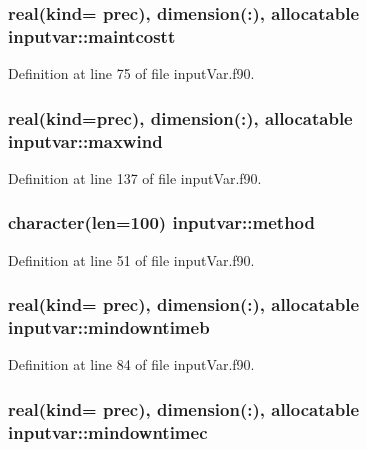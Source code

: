\hypertarget{classinputvar_abeac95d7e558ca06d4456187b380fdbc}{
\subsubsection[{maintcostt}]{\setlength{\rightskip}{0pt plus 5cm}real(kind= prec), dimension(\-:), allocatable inputvar\-::maintcostt}}\label{classinputvar_abeac95d7e558ca06d4456187b380fdbc}


Definition at line 75 of file input\-Var.\-f90.

\hypertarget{classinputvar_a42a243861fa635356cdd79a587633909}{
\subsubsection[{maxwind}]{\setlength{\rightskip}{0pt plus 5cm}real(kind=prec), dimension(\-:), allocatable inputvar\-::maxwind}}\label{classinputvar_a42a243861fa635356cdd79a587633909}


Definition at line 137 of file input\-Var.\-f90.

\hypertarget{classinputvar_ad9c1a09ed4bd46ad673997ee302451a4}{
\subsubsection[{method}]{\setlength{\rightskip}{0pt plus 5cm}character(len=100) inputvar\-::method}}\label{classinputvar_ad9c1a09ed4bd46ad673997ee302451a4}


Definition at line 51 of file input\-Var.\-f90.

\hypertarget{classinputvar_ae93da8603e9899963da53596705b1d98}{
\subsubsection[{mindowntimeb}]{\setlength{\rightskip}{0pt plus 5cm}real(kind= prec), dimension(\-:), allocatable inputvar\-::mindowntimeb}}\label{classinputvar_ae93da8603e9899963da53596705b1d98}


Definition at line 84 of file input\-Var.\-f90.

\hypertarget{classinputvar_a9bb1424e04e5c89d561d2316045f98d4}{
\subsubsection[{mindowntimec}]{\setlength{\rightskip}{0pt plus 5cm}real(kind= prec), dimension(\-:), allocatable inputvar\-::mindowntimec}}\label{classinputvar_a9bb1424e04e5c89d561d2316045f98d4}



